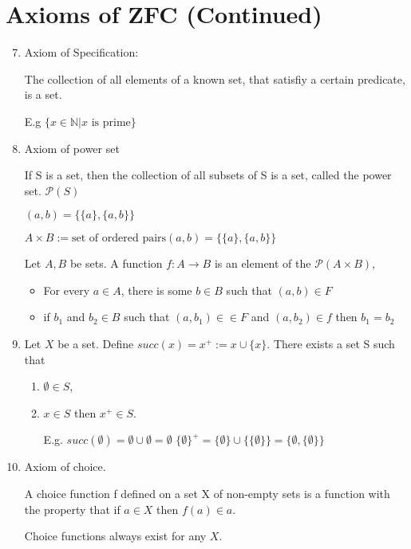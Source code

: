 \documentclass[twoside]{article}
\newcommand{\N}{\mathbb{N}}
\begin{document}

\section{Axioms of ZFC (Continued)}

\begin{enumerate}
    \setcounter{enumi}{6}
    \item Axiom of Specification:

          The collection of all elements of a known set, that satisfiy a certain predicate, is a set.

          E.g $\{x \in \N \vert x \text{ is prime}\}$

    \item Axiom of power set

          If S is a set, then the collection of all subsets of S is a set, called the power set. $\mathcal P (S)$

          $(a,b) = \{\{a\}, \{a, b\}\}$

          $A \times B := \text{set of ordered pairs} (a,b) = \{\{a\}, \{a, b\}\}$

          Let $A,B$ be sets. A function $f : A \rightarrow B$ is an element of the $\mathcal{P} (A \times B)$,

          \begin{itemize}
              \item For every $a \in A$, there is some $b \in B$ such that $(a,b) \in F$

              \item if $b_1$ and $b_2 \in B$ such that $(a,b_1) \in \in F$ and $(a, b_2) \in f$ then $b_1 = b_2$
          \end{itemize}

    \item Let $X$ be a set. Define $succ(x) = x^{+} := x \cup \{x\}$.
          There exists a set S such that
          \begin{enumerate}
              \item $\emptyset \in S$,
              \item $x \in S$ then $x^{+} \in S$.

                    E.g. $succ(\emptyset) = \emptyset \cup {\emptyset} = {\emptyset}$
                    $\{\emptyset\}^{+} = \{\emptyset\} \cup \{\{\emptyset\}\} = \{\emptyset, \{\emptyset\}\}$
          \end{enumerate}

    \item Axiom of choice.

          A choice function f defined on a set X of non-empty sets is a function with the property that if $a \in X$ then $f(a) \in a$.

          Choice functions always exist for any $X$.
\end{enumerate}
\end{document}

